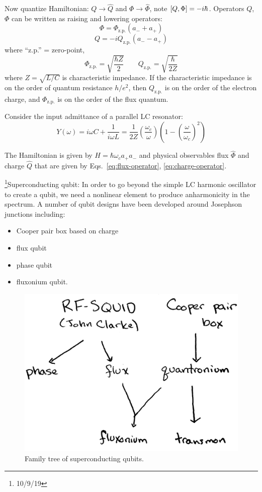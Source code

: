 \documentclass[12pt]{article}
\begin{document}
Now quantize Hamiltonian: $Q \rightarrow \hat{Q}$ and $\Phi \rightarrow
\hat{\Phi}$, note $\comm{Q}{\Phi} = -i\hbar$. Operators $Q$, $\Phi$ can be
written as raising and lowering operators:
\begin{equation}
    \Phi = \Phi_\text{z.p.} \left(a_- + a_+\right)
    \label{eq:flux-operator}
\end{equation}
\begin{equation}
    Q = -iQ_\text{z.p.} \left(a_- - a_+\right)
    \label{eq:charge-operator}
\end{equation}
where ``z.p.'' = zero-point,
\[\Phi_\text{z.p.} = \sqrt{\frac{\hbar Z}{2}} \qquad
Q_\text{z.p.} = \sqrt{\frac{\hbar}{2Z}}\]
where $Z = \sqrt{L/C}$ is characteristic impedance. If the characteristic
impedance is on the order of quantum resistance $h/e^2$, then $Q_\text{z.p.}$
is on the order of the electron charge, and $\Phi_\text{z.p.}$ is on the order
of the flux quantum.

Consider the input admittance of a parallel LC resonator:
\[Y(\omega) = i\omega C + \frac{1}{i\omega L} 
= \frac{1}{2Z} \left(\frac{\omega_c}{\omega}\right)
\left(1 - \left(\frac{\omega}{\omega_c}\right)^2 \right)\]

The Hamiltonian is given by $H = \hbar\omega_c a_+a_-$ and physical observables
flux $\hat{\Phi}$ and charge $\hat{Q}$ that are given by
Eqs.~\eqref{eq:flux-operator}, \eqref{eq:charge-operator}.

\footnote{10/9/19}Superconducting qubit: In order to go beyond the simple LC
harmonic oscillator to create a qubit, we need a nonlinear element to produce
anharmonicity in the spectrum. A number of qubit designs have been developed
around Josephson junctions including:
\begin{itemize}
    \item Cooper pair box based on charge
    \item flux qubit
    \item phase qubit
    \item fluxonium qubit.
\end{itemize}

\begin{figure}[htpb]
    \centering
    \includegraphics[width=0.7\linewidth]{family-tree.jpg}
    \caption{Family tree of superconducting qubits.}%
    \label{fig:supercond-qubit-family-tree}
\end{figure}
\end{document}
